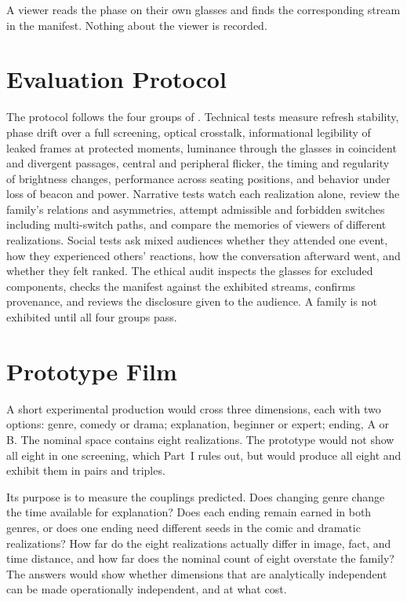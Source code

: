 A viewer reads the phase on their own glasses and finds the corresponding stream in the manifest. Nothing about the viewer is recorded.

\chapter{Evaluation Protocol}\label{app:protocol}

The protocol follows the four groups of . Technical tests measure refresh stability, phase drift over a full screening, optical crosstalk, informational legibility of leaked frames at protected moments, luminance through the glasses in coincident and divergent passages, central and peripheral flicker, the timing and regularity of brightness changes, performance across seating positions, and behavior under loss of beacon and power. Narrative tests watch each realization alone, review the family's relations and asymmetries, attempt admissible and forbidden switches including multi-switch paths, and compare the memories of viewers of different realizations. Social tests ask mixed audiences whether they attended one event, how they experienced others' reactions, how the conversation afterward went, and whether they felt ranked. The ethical audit inspects the glasses for excluded components, checks the manifest against the exhibited streams, confirms provenance, and reviews the disclosure given to the audience. A family is not exhibited until all four groups pass.

\chapter{Prototype Film}\label{app:prototype}

A short experimental production would cross three dimensions, each with two options: genre, comedy or drama; explanation, beginner or expert; ending, A or B. The nominal space contains eight realizations. The prototype would not show all eight in one screening, which Part~I rules out, but would produce all eight and exhibit them in pairs and triples.

Its purpose is to measure the couplings  predicted. Does changing genre change the time available for explanation? Does each ending remain earned in both genres, or does one ending need different seeds in the comic and dramatic realizations? How far do the eight realizations actually differ in image, fact, and time distance, and how far does the nominal count of eight overstate the family? The answers would show whether dimensions that are analytically independent can be made operationally independent, and at what cost.

